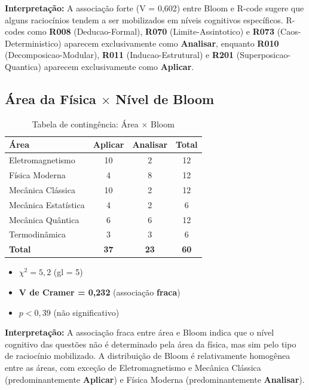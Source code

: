 \documentclass[12pt,a4paper]{article}
\newcommand{\rcode}[1]{\textcolor{azulprof}{\textbf{#1}}}
\newcommand{\bloom}[1]{\textcolor{verdeexame}{\textbf{#1}}}
\begin{document}
\textbf{Interpretação:} A associação forte (V = 0,602) entre Bloom e
R-code sugere que alguns raciocínios tendem a ser mobilizados em níveis
cognitivos específicos. R-codes como \rcode{R008} (Deducao-Formal),
\rcode{R070} (Limite-Assintotico) e \rcode{R073} (Caos-Deterministico)
aparecem exclusivamente como \bloom{Analisar}, enquanto \rcode{R010}
(Decomposicao-Modular), \rcode{R011} (Inducao-Estrutural) e \rcode{R201}
(Superposicao-Quantica) aparecem exclusivamente como \bloom{Aplicar}.

\subsection{Área da Física $\times$ Nível de Bloom}

\begin{table}[H]
\centering
\caption{Tabela de contingência: Área $\times$ Bloom}
\label{tab:area_bloom}
\begin{tabular}{lccc}
\toprule
\textbf{Área} & \textbf{Aplicar} & \textbf{Analisar} & \textbf{Total} \\
\midrule
Eletromagnetismo & 10 & 2 & 12 \\
Física Moderna & 4 & 8 & 12 \\
Mecânica Clássica & 10 & 2 & 12 \\
Mecânica Estatística & 4 & 2 & 6 \\
Mecânica Quântica & 6 & 6 & 12 \\
Termodinâmica & 3 & 3 & 6 \\
\midrule
\textbf{Total} & \textbf{37} & \textbf{23} & \textbf{60} \\
\bottomrule
\end{tabular}
\end{table}

\begin{itemize}
  \item $\chi^2 = 5,2$ (gl = 5)
  \item \textbf{V de Cramer = 0,232} (associação \textbf{fraca})
  \item $p < 0,39$ (não significativo)
\end{itemize}

\textbf{Interpretação:} A associação fraca entre área e Bloom indica que
o nível cognitivo das questões não é determinado pela área da física, mas
sim pelo tipo de raciocínio mobilizado. A distribuição de Bloom é
relativamente homogênea entre as áreas, com exceção de Eletromagnetismo
e Mecânica Clássica (predominantemente \bloom{Aplicar}) e Física Moderna
(predominantemente \bloom{Analisar}).
\end{document}
